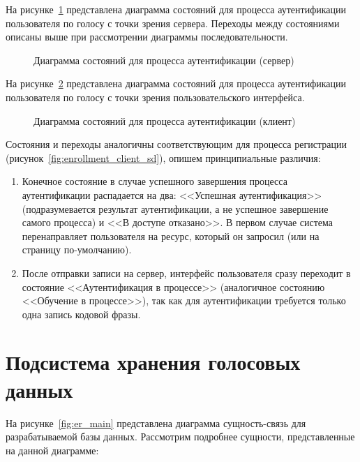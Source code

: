 На рисунке~\ref{fig:verification_server_sd} представлена диаграмма состояний
для процесса аутентификации пользователя по голосу с точки зрения сервера.
Переходы между состояниями описаны выше при рассмотрении диаграммы
последовательности.

\begin{figure}
    \caption{Диаграмма состояний для процесса аутентификации (сервер)}
    \label{fig:verification_server_sd}
\end{figure}

На рисунке~\ref{fig:verification_client_sd} представлена диаграмма состояний для
процесса аутентификации пользователя по голосу с точки зрения пользовательского
интерфейса.

\begin{figure}[htp!]
    \caption{Диаграмма состояний для процесса аутентификации (клиент)}
    \label{fig:verification_client_sd}
\end{figure}

Состояния и переходы аналогичны соответствующим для процесса регистрации
(рисунок~\ref{fig:enrollment_client_sd}), опишем принципиальные различия:

\begin{enumerate}
\item Конечное состояние в случае успешного завершения процесса аутентификации
распадается на два: <<Успешная аутентификация>> (подразумевается результат
аутентификации, а не успешное завершение самого процесса) и <<В доступе
отказано>>. В первом случае система перенаправляет пользователя на ресурс,
который он запросил (или на страницу по-умолчанию).
\item После отправки записи на сервер, интерфейс пользователя сразу переходит в
состояние <<Аутентификация в процессе>> (аналогичное состоянию <<Обучение в
процессе>>), так как для аутентификации требуется только одна запись кодовой
фразы.
\end{enumerate}

\section{Подсистема хранения голосовых данных}

На рисунке~\ref{fig:er_main} представлена диаграмма сущность-связь для разрабатываемой базы данных. Рассмотрим подробнее сущности, представленные на данной диаграмме:


